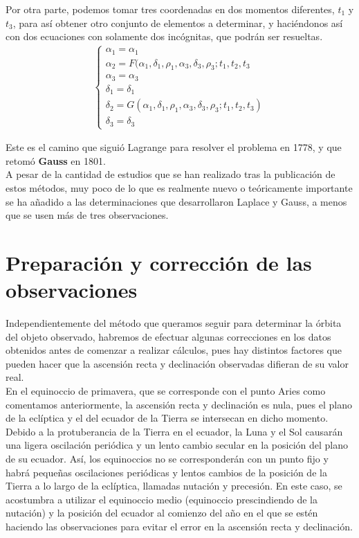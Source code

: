 Por otra parte, podemos tomar tres coordenadas en dos momentos diferentes, $t_1$ y $t_3$, para así obtener otro conjunto de elementos a determinar, y haciéndonos así con dos ecuaciones con solamente dos incógnitas, que podrán ser resueltas.
\begin{align}
\left\{\begin{array}{l}
	\alpha_1 = \alpha_1\\
	\alpha_2 = F(\alpha_1, \delta_1, \rho_1, \alpha_3, \delta_3, \rho_3; t_1, t_2, t_3\\
	\alpha_3 = \alpha_3\\
	\delta_1 = \delta_1\\
	\delta_2 = G(\alpha_1, \delta_1, \rho_1, \alpha_3, \delta_3, \rho_3; t_1, t_2, t_3)\\
	\delta_3 = \delta_3
\end{array}
\right.
\label{eq:camino_gauss}
\end{align}

Este es el camino que siguió Lagrange para resolver el problema en 1778, y que retomó \textbf{Gauss} en 1801.\\

A pesar de la cantidad de estudios que se han realizado tras la publicación de estos métodos, muy poco de lo que es realmente nuevo o teóricamente importante se ha añadido a las determinaciones que desarrollaron Laplace y Gauss, a menos que se usen más de tres observaciones. \cite{moulton}\\


\section{Preparación y corrección de las observaciones}
Independientemente del método que queramos seguir para determinar la órbita del objeto observado, habremos de efectuar algunas correcciones en los datos obtenidos antes de comenzar a realizar cálculos, pues hay distintos factores que pueden hacer que la ascensión recta y declinación observadas difieran de su valor real.\\

En el equinoccio de primavera, que se corresponde con el punto Aries como comentamos anteriormente, la ascensión recta y declinación es nula, pues el plano de la eclíptica y el del ecuador de la Tierra se intersecan en dicho momento. Debido a la protuberancia de la Tierra en el ecuador, la Luna y el Sol causarán una ligera oscilación periódica y un lento cambio secular en la posición del plano de su ecuador. Así, los equinoccios no se corresponderán con un punto fijo y habrá pequeñas oscilaciones periódicas y lentos cambios de la posición de la Tierra a lo largo de la eclíptica, llamadas nutación y precesión. En este caso, se acostumbra a utilizar el equinoccio medio (equinoccio prescindiendo de la nutación) y la posición del ecuador al comienzo del año en el que se estén haciendo las observaciones para evitar el error en la ascensión recta y declinación.\\

